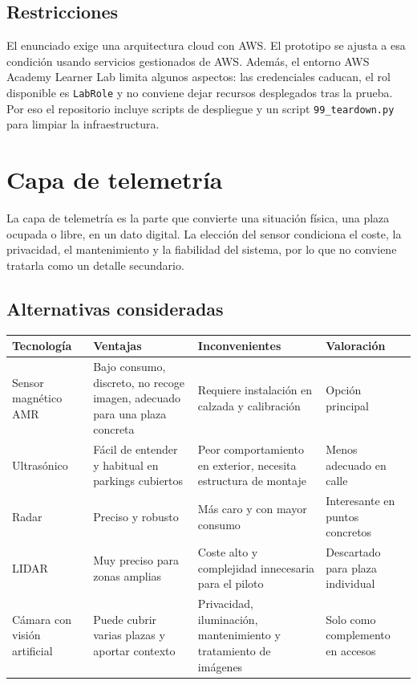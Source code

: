 \documentclass[11pt,a4paper]{article}
\begin{document}
\subsection{Restricciones}

El enunciado exige una arquitectura cloud con AWS. El prototipo se ajusta a esa condición usando servicios gestionados de AWS. Además, el entorno AWS Academy Learner Lab limita algunos aspectos: las credenciales caducan, el rol disponible es \texttt{LabRole} y no conviene dejar recursos desplegados tras la prueba. Por eso el repositorio incluye scripts de despliegue y un script \texttt{99\_teardown.py} para limpiar la infraestructura.

\section{Capa de telemetría}

La capa de telemetría es la parte que convierte una situación física, una plaza ocupada o libre, en un dato digital. La elección del sensor condiciona el coste, la privacidad, el mantenimiento y la fiabilidad del sistema, por lo que no conviene tratarla como un detalle secundario.

\subsection{Alternativas consideradas}
\begin{longtable}{P{3.1cm}P{4.2cm}P{4.2cm}P{3.1cm}}
\toprule
\textbf{Tecnología} & \textbf{Ventajas} & \textbf{Inconvenientes} & \textbf{Valoración} \\
\midrule
\endhead
Sensor magnético AMR & Bajo consumo, discreto, no recoge imagen, adecuado para una plaza concreta & Requiere instalación en calzada y calibración & Opción principal \\
Ultrasónico & Fácil de entender y habitual en parkings cubiertos & Peor comportamiento en exterior, necesita estructura de montaje & Menos adecuado en calle \\
Radar & Preciso y robusto & Más caro y con mayor consumo & Interesante en puntos concretos \\
LIDAR & Muy preciso para zonas amplias & Coste alto y complejidad innecesaria para el piloto & Descartado para plaza individual \\
Cámara con visión artificial & Puede cubrir varias plazas y aportar contexto & Privacidad, iluminación, mantenimiento y tratamiento de imágenes & Solo como complemento en accesos \\
\bottomrule
\end{longtable}
\end{document}
